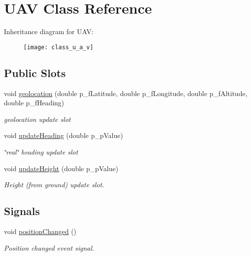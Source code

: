 \hypertarget{class_u_a_v}{\section{U\-A\-V Class Reference}
\label{class_u_a_v}
}
Inheritance diagram for U\-A\-V\-:\begin{figure}[H]
\begin{center}
\leavevmode
\texttt{[image: class\_u\_a\_v]}
\end{center}
\end{figure}
\subsection*{Public Slots}
\begin{DoxyCompactItemize}
\item 
void \hyperlink{class_u_a_v_aebcf8ed8f6b28185ffcb09a55b0093ed}{geolocation} (double p\-\_\-f\-Latitude, double p\-\_\-f\-Longitude, double p\-\_\-f\-Altitude, double p\-\_\-f\-Heading)
\begin{DoxyCompactList}\small\item\em geolocation update slot \end{DoxyCompactList}\item 
void \hyperlink{class_u_a_v_ae27e7c862addff35df70ff932798c136}{update\-Heading} (double p\-\_\-p\-Value)
\begin{DoxyCompactList}\small\item\em \char`\"{}real\char`\"{} heading update slot \end{DoxyCompactList}\item 
void \hyperlink{class_u_a_v_a76a1b64dfb1f7ee7d3f0ce8ce62ee00a}{update\-Height} (double p\-\_\-p\-Value)
\begin{DoxyCompactList}\small\item\em Height (from ground) update slot. \end{DoxyCompactList}\end{DoxyCompactItemize}
\subsection*{Signals}
\begin{DoxyCompactItemize}
\item 
void \hyperlink{class_u_a_v_a3c17671f5fe290fc57c6b493a5fcda4b}{position\-Changed} ()
\begin{DoxyCompactList}\small\item\em Position changed event signal. \end{DoxyCompactList}\end{DoxyCompactItemize}

